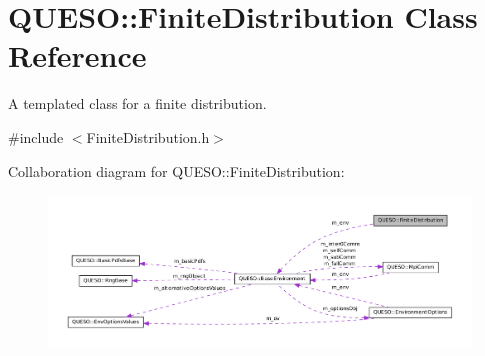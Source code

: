 \hypertarget{class_q_u_e_s_o_1_1_finite_distribution}{\section{Q\-U\-E\-S\-O\-:\-:Finite\-Distribution Class Reference}
\label{class_q_u_e_s_o_1_1_finite_distribution}
}


A templated class for a finite distribution.  




{\ttfamily \#include $<$Finite\-Distribution.\-h$>$}



Collaboration diagram for Q\-U\-E\-S\-O\-:\-:Finite\-Distribution\-:
\nopagebreak
\begin{figure}[H]
\begin{center}
\leavevmode
\includegraphics[width=350pt]{class_q_u_e_s_o_1_1_finite_distribution__coll__graph}
\end{center}
\end{figure}
